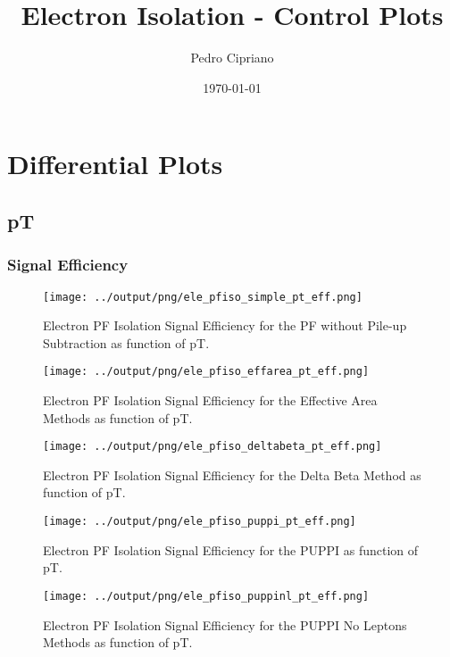 \documentclass[11pt]{book}
\begin{document}
         
 
 \author{Pedro Cipriano}
 \date{\today}
 \title{Electron Isolation - Control Plots}

\maketitle

\tableofcontents

\chapter{Differential Plots}
\section{pT}

\subsection{Signal Efficiency}
\begin{figure}[htb]
\centering
\texttt{[image: ../output/png/ele\_pfiso\_simple\_pt\_eff.png]}
\caption{Electron PF Isolation Signal Efficiency for the PF without Pile-up Subtraction as function of pT.}
\label{fig:ele_pfiso_pt_eff_simple}
\end{figure}

\begin{figure}[htb]
\centering
\texttt{[image: ../output/png/ele\_pfiso\_effarea\_pt\_eff.png]}
\caption{Electron PF Isolation Signal Efficiency for the Effective Area Methods as function of pT.}
\label{fig:ele_pfiso_pt_eff_effarea}
\end{figure}


\begin{figure}[htb]
\centering
\texttt{[image: ../output/png/ele\_pfiso\_deltabeta\_pt\_eff.png]}
\caption{Electron PF Isolation Signal Efficiency for the Delta Beta Method as function of pT.}
\label{fig:ele_pfiso_pt_eff_deltabeta}
\end{figure}

\begin{figure}[htb]
\centering
\texttt{[image: ../output/png/ele\_pfiso\_puppi\_pt\_eff.png]}
\caption{Electron PF Isolation Signal Efficiency for the PUPPI as function of pT.}
\label{fig:ele_pfiso_pt_eff_puppi}
\end{figure}

\begin{figure}[htb]
\centering
\texttt{[image: ../output/png/ele\_pfiso\_puppinl\_pt\_eff.png]}
\caption{Electron PF Isolation Signal Efficiency for the PUPPI No Leptons Methods as function of pT.}
\label{fig:ele_pfiso_pt_eff_puppinl}
\end{figure}
\end{document}
